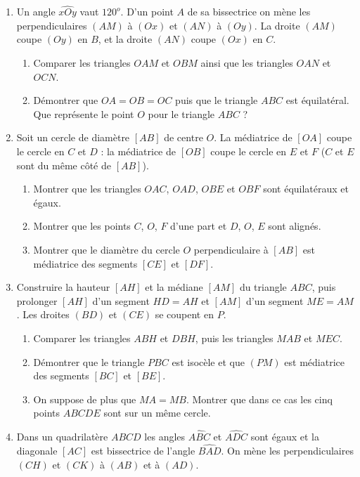 \begin{enumerate}
\begin{enumerate}
\end{enumerate}
\item Un angle $\widehat{xOy}$ vaut $120^o$. D'un point $A$ de sa bissectrice on mène les perpendiculaires $(AM)$ à $(Ox)$ et $(AN)$ à $(Oy)$. La droite $(AM)$ coupe $(Oy)$ en $B$, et la droite $(AN)$ coupe $(Ox)$ en $C$. \begin{enumerate}
\item Comparer les triangles $OAM$ et $OBM$ ainsi que les triangles $OAN$ et $OCN$.
\item Démontrer que $OA=OB=OC$ puis que le triangle $ABC$ est équilatéral. \\ 
Que représente le point $O$ pour le triangle $ABC$ ?
\end{enumerate}
\item Soit un cercle de diamètre $[AB]$ de centre $O$. La médiatrice de $[OA]$ coupe
le cercle en $C$ et $D$ : la médiatrice de $[OB]$ coupe le cercle en $E$ et $F$ ($C$ et $E$ sont du même côté de $[AB]$). \begin{enumerate}
\item Montrer que les triangles $OAC$, $OAD$, $OBE$ et $OBF$ sont équilatéraux et égaux.
\item Montrer que les points $C$, $O$, $F$ d'une part et $D$, $O$, $E$ sont alignés.
\item Montrer que le diamètre du cercle $O$ perpendiculaire à $[AB]$ est médiatrice
des segments $[CE]$ et $[DF]$. 
\end{enumerate}
\item Construire la hauteur $[AH]$ et la médiane $[AM]$ du triangle $ABC$, puis
prolonger $[AH]$ d'un segment $HD=AH$ et $[AM]$ d'un segment $ME=AM$. Les droites $(BD)$ et $(CE)$ se coupent en $P$. \begin{enumerate}
\item Comparer les triangles $ABH$ et $DBH$, puis les triangles $MAB$ et $MEC$. 
\item Démontrer que le triangle $PBC$ est isocèle et que $(PM)$ est médiatrice des segments $[BC]$ et $[BE]$. 
\item On suppose de plus que $MA=MB$. Montrer que dans ce cas les cinq points $ABCDE$ sont sur un même cercle.
\end{enumerate}
\item Dans un quadrilatère $ABCD$ les angles $\widehat{ABC}$ et $\widehat{ADC}$ sont égaux et la diagonale $[AC]$ est bissectrice de l'angle $\widehat{BAD}$. On mène 
les perpendiculaires $(CH)$ et $(CK)$ à $(AB)$ et à $(AD)$. \begin{enumerate}

\end{enumerate}
\end{enumerate}
